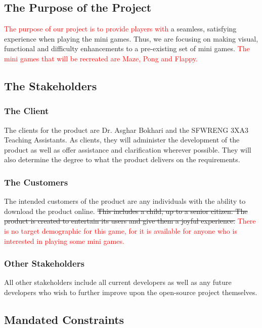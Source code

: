 \documentclass[12pt, titlepage]{article}
\begin{document}
\subsection{The Purpose of the Project}

\textcolor{red}{The purpose of our project is to provide players with} a seamless, satisfying experience when playing the mini games. Thus, we are focusing on making visual, functional and difficulty enhancements to a pre-existing set of mini games. \textcolor{red}{The mini games that will be recreated are Maze, Pong and Flappy.}

\subsection{The Stakeholders}

\subsubsection{The Client}

The clients for the product are Dr. Asghar Bokhari and the SFWRENG 3XA3 Teaching Assistants. As clients, they will administer the development of the product as well as offer assistance and clarification wherever possible. They will also determine the degree to what the product delivers on the requirements.

\subsubsection{The Customers}

The intended customers of the product are any individuals with the ability to download the product online. \sout{This includes a child, up to a senior citizen. The product is created to entertain its users and give them a joyful experience.} \textcolor{red}{There is no target demographic for this game, for it is available for anyone who is interested in playing some mini games.}

\subsubsection{Other Stakeholders}

All other stakeholders include all current developers as well as any future developers who wish to further improve upon the open-source project themselves.

\subsection{Mandated Constraints}
\end{document}
